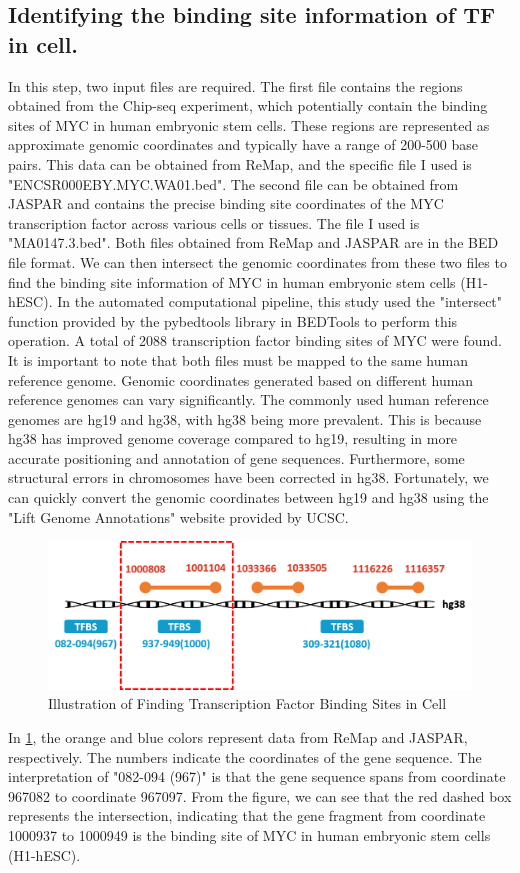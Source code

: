 \documentclass{PHlab-thesis}
\begin{document}
\subsection[Finding TFBSs]{Identifying the binding site information of TF in cell.}
In this step, two input files are required. The first file contains the regions obtained from the Chip-seq experiment, which potentially contain the binding sites of MYC in human embryonic stem cells. These regions are represented as approximate genomic coordinates and typically have a range of 200-500 base pairs. This data can be obtained from ReMap, and the specific file I used is "ENCSR000EBY.MYC.WA01.bed". The second file can be obtained from JASPAR and contains the precise binding site coordinates of the MYC transcription factor across various cells or tissues. The file I used is "MA0147.3.bed". Both files obtained from ReMap and JASPAR are in the BED file format. We can then intersect the genomic coordinates from these two files to find the binding site information of MYC in human embryonic stem cells (H1-hESC). In the automated computational pipeline, this study used the "intersect" function provided by the pybedtools library in BEDTools to perform this operation. A total of 2088 transcription factor binding sites of MYC were found.
It is important to note that both files must be mapped to the same human reference genome. Genomic coordinates generated based on different human reference genomes can vary significantly. The commonly used human reference genomes are hg19 and hg38, with hg38 being more prevalent. This is because hg38 has improved genome coverage compared to hg19, resulting in more accurate positioning and annotation of gene sequences. Furthermore, some structural errors in chromosomes have been corrected in hg38. Fortunately, we can quickly convert the genomic coordinates between hg19 and hg38 using the "Lift Genome Annotations" website provided by UCSC.
\begin{figure}[H]
	\centering
	\includegraphics[scale=0.6]{figures/findTFBSs.png}
	\caption{Illustration of Finding Transcription Factor Binding Sites in Cell }
	\label{fig:findTFBSs} %
\end{figure}
In \ref{fig:findTFBSs}, the orange and blue colors represent data from ReMap and JASPAR, respectively. The numbers indicate the coordinates of the gene sequence. The interpretation of "082-094 (967)" is that the gene sequence spans from coordinate 967082 to coordinate 967097. From the figure, we can see that the red dashed box represents the intersection, indicating that the gene fragment from coordinate 1000937 to 1000949 is the binding site of MYC in human embryonic stem cells (H1-hESC).
\end{document}
